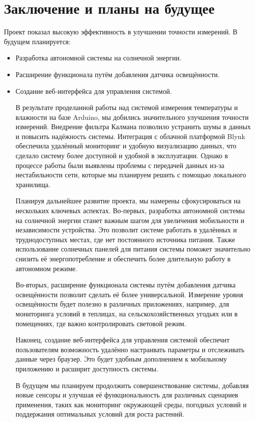\documentclass[a4paper,12pt]{article}
\begin{document}
\section{Заключение и планы на будущее}
Проект показал высокую эффективность в улучшении точности измерений. В будущем планируется:
\begin{itemize}
    \item Разработка автономной системы на солнечной энергии.
    \item Расширение функционала путём добавления датчика освещённости.
    \item Создание веб-интерфейса для управления системой.

В результате проделанной работы над системой измерения температуры и влажности на базе Arduino, мы добились значительного улучшения точности измерений. Внедрение фильтра Калмана позволило устранить шумы в данных и повысить надёжность системы. Интеграция с облачной платформой Blynk обеспечила удалённый мониторинг и удобную визуализацию данных, что сделало систему более доступной и удобной в эксплуатации. Однако в процессе работы были выявлены проблемы с передачей данных из-за нестабильности сети, которые мы планируем решить с помощью локального хранилища.

Планируя дальнейшее развитие проекта, мы намерены сфокусироваться на нескольких ключевых аспектах. Во-первых, разработка автономной системы на солнечной энергии станет важным шагом для увеличения мобильности и независимости устройства. Это позволит системе работать в удалённых и труднодоступных местах, где нет постоянного источника питания. Также использование солнечных панелей для питания системы поможет значительно снизить её энергопотребление и обеспечить более длительную работу в автономном режиме.

Во-вторых, расширение функционала системы путём добавления датчика освещённости позволит сделать её более универсальной. Измерение уровня освещённости будет полезно в различных приложениях, например, для мониторинга условий в теплицах, на сельскохозяйственных угодьях или в помещениях, где важно контролировать световой режим.

Наконец, создание веб-интерфейса для управления системой обеспечит пользователям возможность удалённо настраивать параметры и отслеживать данные через браузер. Это будет удобным дополнением к мобильному приложению и расширит доступность системы.

В будущем мы планируем продолжить совершенствование системы, добавляя новые сенсоры и улучшая её функциональность для различных сценариев применения, таких как мониторинг окружающей среды, погодных условий и поддержания оптимальных условий для роста растений.
\end{itemize}
\end{document}
